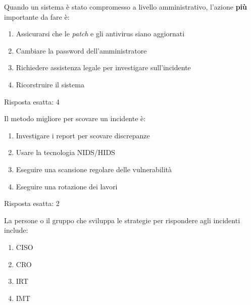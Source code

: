 \begin{Exercise} [
  title={Quiz},
  label={esIRBC3}
  ]

  \Question Quando un sistema \`e stato compromesso a livello amministrativo,
l'azione \textbf{pi\`u} importante da fare \`e:
\begin{enumerate}
 \item Assicurarsi che le \textit{patch} e gli antivirus siano aggiornati
 \item Cambiare la password dell'amministratore
 \item Richiedere assistenza legale per investigare sull'incidente
 \item Ricorstruire il sistema
\end{enumerate}
\end{Exercise}

\begin{Answer} [
  ref={esIRBC3},
  number={3}
  ]

  \Question Risposta esatta: 4
\end{Answer}


\begin{Exercise} [
  title={Quiz},
  label={esIRBC4}
  ]

  \Question Il metodo migliore per scovare un incidente \`e:
  \begin{enumerate}
   \item Investigare i report per scovare discrepanze
   \item Usare la tecnologia NIDS/HIDS
   \item Eseguire una scansione regolare delle vulnerabilit\`a
   \item Eseguire una rotazione dei lavori
  \end{enumerate}
\end{Exercise}

\begin{Answer} [
  ref={esIRBC4},
  number={4}
  ]

  \Question Risposta esatta: 2
\end{Answer}


\begin{Exercise} [
  title={Quiz},
  label={esIRBC5}
  ]

  \Question La persone o il gruppo che sviluppa le strategie per rispondere
agli incidenti include:
\begin{enumerate}
 \item CISO
 \item CRO
 \item IRT
 \item IMT
\end{enumerate}

\end{Exercise}

